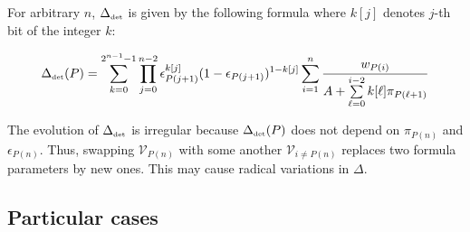 \documentclass[11pt]{llncs}
\begin{document}
For arbitrary $n$, $\Delta_{\mbox{{\tiny det}}}$ is given by the following formula where $k[j]$ denotes $j$-th bit of the integer $k$:

$$\Delta_{\mbox{{\tiny det}}}(P)=\sum_{k=0}^{2^{n-1}-1}\prod_{j=0}^{n-2} \epsilon_{P(j+1)}^{k[j]} (1-\epsilon_{P(j+1)})^{1-k[j]} \sum_{i=1}^n \frac{w_{P(i)}}{A+\sum\limits_{\ell=0}^{i-2} k[\ell] \pi_{P(\ell+1)}}$$

The evolution of $\Delta_{\mbox{{\tiny det}}}$ is irregular because $\Delta_{\mbox{{\tiny det}}}(P)$ does not depend on $\pi_{P(n)}$ and $\epsilon_{P(n)}$. Thus, swapping $\mathcal{V}_{P(n)}$ with some another $\mathcal{V}_{i\neq P(n)}$ replaces two formula parameters by new ones. This may cause radical variations in $\Delta$.%

\subsection{Particular cases}
\end{document}
